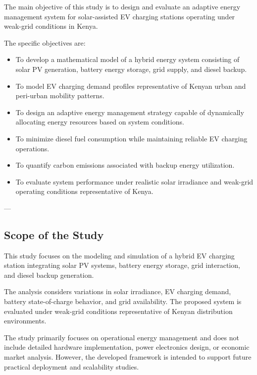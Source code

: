 The main objective of this study is to design and evaluate an adaptive energy management system for solar-assisted EV charging stations operating under weak-grid conditions in Kenya.

The specific objectives are:

\begin{itemize}
    \item To develop a mathematical model of a hybrid energy system consisting of solar PV generation, battery energy storage, grid supply, and diesel backup.
    
    \item To model EV charging demand profiles representative of Kenyan urban and peri-urban mobility patterns.
    
    \item To design an adaptive energy management strategy capable of dynamically allocating energy resources based on system conditions.
    
    \item To minimize diesel fuel consumption while maintaining reliable EV charging operations.
    
    \item To quantify carbon emissions associated with backup energy utilization.
    
    \item To evaluate system performance under realistic solar irradiance and weak-grid operating conditions representative of Kenya.
\end{itemize}

---

\subsection{Scope of the Study}

This study focuses on the modeling and simulation of a hybrid EV charging station integrating solar PV systems, battery energy storage, grid interaction, and diesel backup generation.

The analysis considers variations in solar irradiance, EV charging demand, battery state-of-charge behavior, and grid availability. The proposed system is evaluated under weak-grid conditions representative of Kenyan distribution environments.

The study primarily focuses on operational energy management and does not include detailed hardware implementation, power electronics design, or economic market analysis. However, the developed framework is intended to support future practical deployment and scalability studies.

